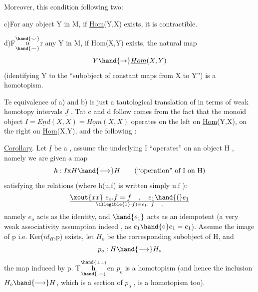 Moreover,  this condition  following two:

c)\quad For any object Y in M, if \underline{Hom}(Y,X) exists, it is contractible.

d)\quad F$\overset{\hand{\smile}}{\underset{\hand{\frown}}{\mathrm o}}$r any Y in M, if Hom(X,Y) exists, the natural map
\[ Y \hand{\to} \underline{Hom}(X,Y) \]
(identifying Y to the ``subobject of constant maps from X to Y'') is a
homotopism.

Te equivalence of a) and b) is just a tautological translation
of \allowbreak{}  in terms of  weak homotopy intervals $\underline{J}$ .
Tat c\hand{)} and d\hand{)} follow comes from the fact that the monoïd object
$I = \underline{End}(X,X) = \underline{Hom}(X,X)$ operates on the left on \underline{Hom}(Y,X), on the right
on \underline{Hom}(X,Y), and the following :

\uline{Corollary}. Let $\underline{I}$ be a , assume the underlying I
``operates'' on an object H , namely we are given a map
\[ h: I\mathrm{x}H \hand{\longrightarrow} H \qquad (\text{``operation'' of I on H}) \]
satisfying the relations (where h(u,f) is written simply u.f ):
\[ \xout{xx}\ e_o.f = f \quad , \quad e_1\hand{(}e_1\over{\illegible{1}}{\cdot}f) = e_1.\ f \quad , \]
namely $e_o$ acts as the identity, and $\hand{e_1}$ acts as an idempotent  (a very
weak associativity assumption indeed , as $e_1\hand{\circ}e_1 = e_1$). Assume the image
of p i.e. Ker($id_H$,p) exists, let $H_o$ be the corresponding subobject of
H, and 
\[ p_o : H \hand{\longrightarrow} H_o \]
the map induced by p. T$\overset{\hand{\scriptscriptstyle\perp\perp}}{\underset{\hand{\scriptscriptstyle,\frown}}{\mathrm h}}$en $p_o$ is a homotopism (and hence the inclusion
$H_o \hand{\longrightarrow} H$, which is a section of $p_o$ , is a homotopism too).

